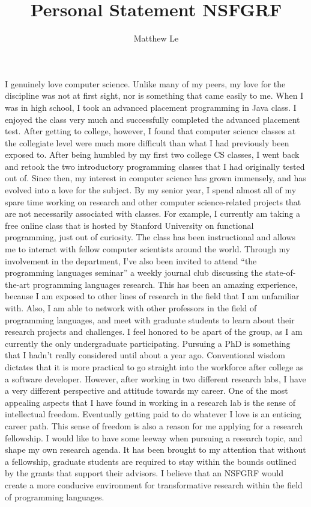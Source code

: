 \documentclass[a4paper,12pt]{article}
\title{Personal Statement NSFGRF}
\author{Matthew Le}
\newcommand{\tab}{\hspace*{2em}}
\begin{document}
\maketitle

I genuinely love computer science. Unlike many of my peers, my love for the discipline was not at first sight, nor is something that came easily to me. When I was in high school, I took an advanced placement programming in Java class. I enjoyed the class very much and successfully completed the advanced placement test. After getting to college, however, I found that computer science classes at the collegiate level were much more difficult than what I had previously been exposed to. After being humbled by my first two college CS classes, I went back and retook the two introductory programming classes that I had originally tested out of. Since then, my interest in computer science has grown immensely, and has evolved into a love for the subject. By my senior year, I spend almost all of my spare time working on research and other computer science-related projects that are not necessarily associated with classes. For example, I currently am taking a free online class that is hosted by Stanford University on functional programming, just out of curiosity. The class has been instructional and allows me to interact with fellow computer scientists around the world. Through my involvement in the department, I've also been invited to attend ``the programming languages seminar'' a weekly journal club discussing the state-of-the-art programming languages research. This has been an amazing experience, because I am exposed to other lines of research in the field that I am unfamiliar with. Also, I am able to network with other professors in the field of programming languages, and meet with graduate students to learn about their research projects and challenges. I feel honored to be apart of the group, as I am currently the only undergraduate participating.  \newline
\tab Pursuing a PhD is something that I hadn't really considered until about a year ago. Conventional wisdom dictates that it is  more practical to go straight into the workforce after college as a software developer. However, after working in two different research labs, I have a very different perspective and attitude towards my career. One of the most appealing aspects that I have found in working in a research lab is the sense of intellectual freedom.  Eventually getting paid to do whatever I love is an enticing career path. This sense of freedom is also a reason for me applying for a research fellowship. I would like to have some leeway when pursuing a research topic, and shape my own research agenda. It has been brought to my attention that without a fellowship, graduate students are required to stay within the bounds outlined by the grants that support their advisors. I believe that an NSFGRF would create a more conducive environment for transformative research within the field of programming languages.
\end{document}

